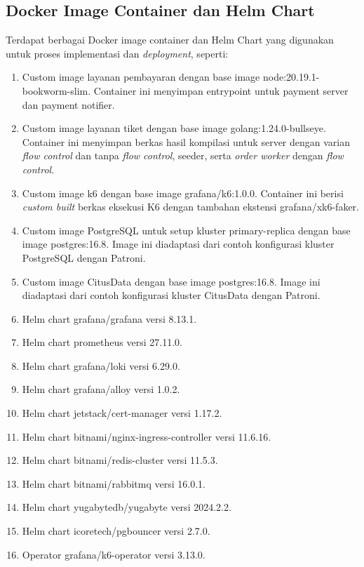 \subsection{Docker Image Container dan Helm Chart}

Terdapat berbagai Docker image container dan Helm Chart yang digunakan untuk proses implementasi dan \textit{deployment}, seperti:

\begin{enumerate}
    \item Custom image layanan pembayaran dengan base image node:20.19.1-bookworm-slim. Container ini menyimpan entrypoint untuk payment server dan payment notifier.
    \item Custom image layanan tiket dengan base image golang:1.24.0-bullseye. Container ini menyimpan berkas hasil kompilasi untuk server dengan varian \textit{flow control} dan tanpa \textit{flow control}, seeder, serta \textit{order worker} dengan \textit{flow control}.
    \item Custom image k6 dengan base image grafana/k6:1.0.0. Container ini berisi \textit{custom built} berkas eksekusi K6 dengan tambahan ekstensi grafana/xk6-faker.
    \item Custom image PostgreSQL untuk setup kluster primary-replica dengan base image postgres:16.8. Image ini diadaptasi dari contoh konfigurasi kluster PostgreSQL dengan Patroni.
    \item Custom image CitusData dengan base image postgres:16.8. Image ini diadaptasi dari contoh konfigurasi kluster CitusData dengan Patroni.
    \item Helm chart grafana/grafana versi 8.13.1.
    \item Helm chart prometheus versi 27.11.0.
    \item Helm chart grafana/loki versi 6.29.0.
    \item Helm chart grafana/alloy versi 1.0.2.
    \item Helm chart jetstack/cert-manager versi 1.17.2.
    \item Helm chart bitnami/nginx-ingress-controller versi 11.6.16.
    \item Helm chart bitnami/redis-cluster versi 11.5.3.
    \item Helm chart bitnami/rabbitmq versi 16.0.1.
    \item Helm chart yugabytedb/yugabyte versi 2024.2.2.
    \item Helm chart icoretech/pgbouncer versi 2.7.0.
    \item Operator grafana/k6-operator versi 3.13.0.
\end{enumerate}